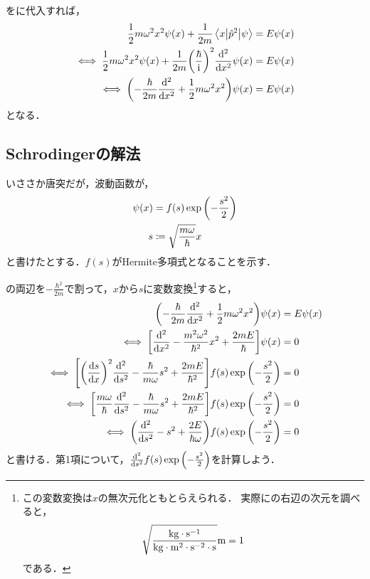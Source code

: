 \documentclass{report}
\begin{document}
    をに代入すれば，
    \begin{align}
      \frac{1}{2}m\omega^2x^2\psi(x) + \frac{1}{2m}\mel**{x}{\hat{p}^2}{\psi} &= E\psi(x) \\ 
      \iff \frac{1}{2}m\omega^2x^2\psi(x) + \frac{1}{2m}\qty(\frac{\hbar}{\mathrm{i}})^2\dv[2]{x}\psi(x) &= E\psi(x) \\ 
      \iff \qty(-\frac{\hbar}{2m}\dv[2]{x} + \frac{1}{2}m\omega^2x^2)\psi(x) &= E\psi(x)\label{schrodinger-eq-wave-func}
    \end{align}
    となる．
  \subsection{Schrodingerの解法}
    いささか唐突だが，波動函数が，
    \begin{align}
      \psi(x) &= f(s)\exp\qty(-\frac{s^2}{2}) \label{psi-fs}\\ 
      s &\coloneqq \sqrt{\frac{m\omega}{\hbar}}x\label{s-def}
    \end{align}
    と書けたとする．$f(s)$がHermite多項式となることを示す．
    \par
    の両辺を$-\frac{\hbar^2}{2m}$で割って，$x$から$s$に変数変換\footnote{
      この変数変換は$x$の無次元化ともとらえられる．
      実際にの右辺の次元を調べると，
      \begin{align*}
        \sqrt{\frac{\mathrm{kg\cdot s^{-1}}}{\mathrm{kg\cdot m^2\cdot s^{-2}\cdot s}}}\mathrm{m} = 1
      \end{align*}
      である．
    }すると，
    \begin{align}
      \qty(-\frac{\hbar}{2m}\dv[2]{x} + \frac{1}{2}m\omega^2x^2)\psi(x) &= E\psi(x) \\ 
      \iff \qty[\dv[2]{x} - \frac{m^2\omega^2}{\hbar^2}x^2 + \frac{2mE}{\hbar}]\psi(x) &= 0 \\ 
      \iff \qty[\qty(\dv{s}{x})^2\dv[2]{s} - \frac{\hbar}{m\omega}s^2 + \frac{2mE}{\hbar^2}]f(s)\exp\qty(-\frac{s^2}{2}) &= 0 \\ 
      \iff \qty[\frac{m\omega}{\hbar}\dv[2]{s} - \frac{\hbar}{m\omega}s^2 + \frac{2mE}{\hbar^2}]f(s)\exp\qty(-\frac{s^2}{2}) &= 0 \\ 
      \iff \qty(\dv[2]{s} - s^2 + \frac{2E}{\hbar\omega})f(s)\exp\qty(-\frac{s^2}{2}) &= 0 \label{before-hermite-polynominal}
    \end{align}
    と書ける．第1項について，$\dv[2]{s}f(s)\exp\qty(-\frac{s^2}{2})$を計算しよう．
\end{document}
